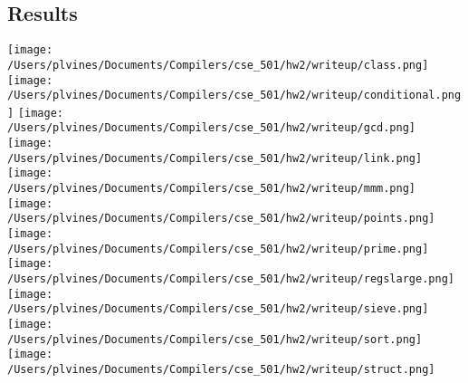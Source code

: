 \documentclass[12pt,letterpaper]{article}
\begin{document}
\subsection*{Results}


\begin{center}
\texttt{[image: /Users/plvines/Documents/Compilers/cse\_501/hw2/writeup/class.png]}
\texttt{[image: /Users/plvines/Documents/Compilers/cse\_501/hw2/writeup/conditional.png]}
\texttt{[image: /Users/plvines/Documents/Compilers/cse\_501/hw2/writeup/gcd.png]}
\texttt{[image: /Users/plvines/Documents/Compilers/cse\_501/hw2/writeup/link.png]}
\texttt{[image: /Users/plvines/Documents/Compilers/cse\_501/hw2/writeup/mmm.png]}
\texttt{[image: /Users/plvines/Documents/Compilers/cse\_501/hw2/writeup/points.png]}
\texttt{[image: /Users/plvines/Documents/Compilers/cse\_501/hw2/writeup/prime.png]}
\texttt{[image: /Users/plvines/Documents/Compilers/cse\_501/hw2/writeup/regslarge.png]}
\texttt{[image: /Users/plvines/Documents/Compilers/cse\_501/hw2/writeup/sieve.png]}
\texttt{[image: /Users/plvines/Documents/Compilers/cse\_501/hw2/writeup/sort.png]}
\texttt{[image: /Users/plvines/Documents/Compilers/cse\_501/hw2/writeup/struct.png]}
\end{center}
\end{document}

